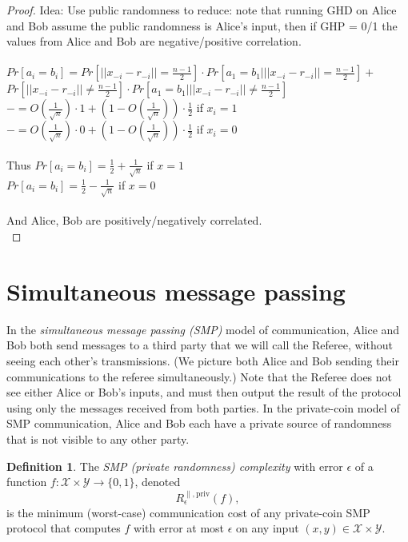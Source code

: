 \documentclass[11pt,oneside]{book}
\theoremstyle{plain}
\theoremstyle{definition}
\newtheorem{definition}{Definition}
\theoremstyle{plain}
\newcommand{\calX}{\mathcal{X}}
\newcommand{\calY}{\mathcal{Y}}
\begin{document}
\begin{proof}
	Idea: Use public randomness to reduce: note that running GHD on Alice and Bob assume the public randomness is Alice's input, then if GHP = 0/1 the values from Alice and Bob are negative/positive correlation.\\
	 \\
	$Pr[a_i=b_i] =Pr[||x_{-i}-r_{-i}||=\frac{n-1}{2}]\cdot Pr[a_1=b_1| ||x_{-i}-r_{-i}||=\frac{n-1}{2}]+$\\
	$Pr[||x_{-i}-r_{-i}||\neq\frac{n-1}{2}]\cdot Pr[a_1=b_1| ||x_{-i}-r_{-i}||\neq\frac{n-1}{2}]$ \\
	$-=O(\frac{1}{\sqrt{n}})\cdot 1+(1-O(\frac{1}{\sqrt{n}}))\cdot \frac12$ if $x_i=1$\\
	$-=O(\frac{1}{\sqrt{n}})\cdot 0+(1-O(\frac{1}{\sqrt{n}}))\cdot \frac12$ if $x_i=0$\\
	 \\
	Thus $Pr[a_i=b_i]=\frac12+\frac{1}{\sqrt{n}}$ if $x=1$\\
	$Pr[a_i=b_i]=\frac12-\frac{1}{\sqrt{n}}$ if $x=0$\\ 
	\\
	And Alice, Bob are positively/negatively correlated.\\
	
\end{proof}


 
\section{Simultaneous message passing}

In the \emph{simultaneous message passing (SMP)} model of communication, Alice and Bob both send messages to a third party that we will call the Referee, without seeing each other's transmissions. (We picture both Alice and Bob sending their communications to the referee simultaneously.) Note that the Referee does not see either Alice or Bob's inputs, and must then output the result of the protocol using only the messages received from both parties. In the private-coin model of SMP communication, Alice and Bob each have a private source of randomness that is not visible to any other party.

\begin{definition}
	The \emph{SMP (private randomness) complexity} with error $\epsilon$ of a function $f : \calX \times \calY \to \{0,1\}$, denoted
	\[
	R^{\parallel,\mathrm{priv}}_\epsilon(f),
	\] 
	is the minimum (worst-case) communication cost of any private-coin SMP protocol that computes $f$ with error at most $\epsilon$ on any input $(x,y) \in \calX \times \calY$.
\end{definition}
\end{document}
